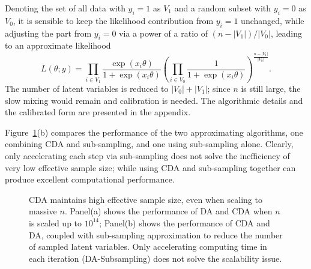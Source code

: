 \documentclass[11pt]{article}
\begin{document}
{Denoting the set of all data with $y_i=1$ as $V_1$ and a random subset  with $y_i=0$ as $V_0$, it is sensible to keep
the likelihood contribution from $y_i=1$ unchanged, while adjusting the part from $y_i=0$ via a power of a ratio of $({n-|V_1|})/{|V_0|}$, leading to an approximate likelihood
$$L(\theta;y) = \prod_{i\in V_1}\frac{\exp(x_i\theta)}{ 1+\exp(x_i\theta)}  (\prod_{i\in V_0}\frac{1}{ 1+\exp(x_i\theta)}
)^{\frac{n-|V_1|}{|V_0|}}.$$
The number of latent variables is reduced to $|V_0|+|V_1|$; since
$n$ is still large, the slow mixing would remain and calibration is needed.
} The algorithmic details and the calibrated form are presented in the appendix.


Figure~\ref{massive_n_sims}(b) compares the performance of the two approximating
algorithms, one  combining CDA and sub-sampling, and one  using sub-sampling alone. Clearly, only accelerating each step via sub-sampling  does not solve the inefficiency  of very low
effective sample size; while using CDA and  sub-sampling together can produce {excellent computational performance}. 


\begin{figure}[h]
  {\caption{CDA  maintains high effective sample size, even when scaling
 to massive $n$. Panel(a) shows the performance of DA and CDA when $n$ is scaled up to
 $10^{14}$; Panel(b) shows the performance of CDA and DA, coupled with sub-sampling
 approximation to reduce the number of sampled latent variables. Only accelerating computing time in each iteration (DA-Subsampling) does not solve the scalability issue.      \label{massive_n_sims}}}
  {%
    \qquad
  }
\end{figure}
\end{document}
